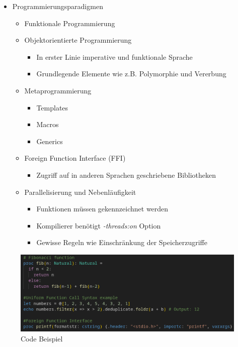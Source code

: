 \documentclass{beamer}
\begin{document}
\begin{frame}
\begin{itemize}
	\item Programmierungsparadigmen
	\begin{itemize}
		\item Funktionale Programmierung
		\item Objektorientierte Programmierung
		\begin{itemize}
			\item In erster Linie imperative und funktionale Sprache
			\item Grundlegende Elemente wie z.B. Polymorphie und Vererbung
		\end{itemize}
		\item Metaprogrammierung
		\begin{itemize}
			\item Templates
			\item Macros
			\item Generics
		\end{itemize}
		\item Foreign Function Interface (FFI)
		\begin{itemize}
			\item Zugriff auf in anderen Sprachen geschriebene Bibliotheken
		\end{itemize}
		\item Parallelisierung und Nebenläufigkeit
		\begin{itemize}
			\item Funktionen müssen gekennzeichnet werden
			\item Kompilierer benötigt \emph{-threads:on} Option
			\item Gewisse Regeln wie Einschränkung der Speicherzugriffe
		\end{itemize}
	\end{itemize}
\end{itemize}
\end{frame}


\begin{frame}
\begin{figure}[htp]
\centering
\includegraphics[scale=0.3]{Code Example.png}
\caption{Code Beispiel}
\label{}
\end{figure}
\end{frame}
\end{document}
